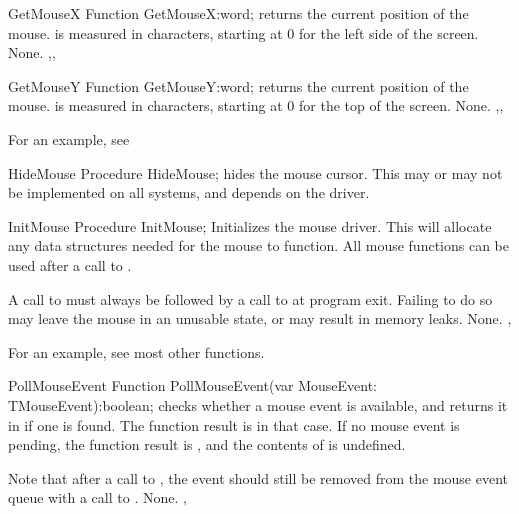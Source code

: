 \begin{function}{GetMouseX}
\Declaration
Function GetMouseX:word;
\Description
{} returns the current  position of the mouse.  is
measured in characters, starting at 0 for the left side of the screen.
\Errors
None.
\SeeAlso
{},, 
\end{function}


\begin{function}{GetMouseY}
\Declaration
Function GetMouseY:word; 
\Description
{} returns the current  position of the mouse.  is
measured in characters, starting at 0 for the top of the screen.
\Errors
None.
\SeeAlso
{},, 
\end{function}

For an example, see 

\begin{procedure}{HideMouse}
\Declaration
Procedure HideMouse;
\Description
{} hides the mouse cursor. This may or may not be implemented
on all systems, and depends on the driver.
\Errors
\SeeAlso
\end{procedure}


\begin{procedure}{InitMouse}
\Declaration
Procedure InitMouse;
\Description
{} Initializes the mouse driver. This will allocate any data
structures needed for the mouse to function. All mouse functions can be
used after a call to .

A call to  must always be followed by a call to 
at program exit. Failing to do so may leave the mouse in an unusable state,
or may result in memory leaks.
\Errors
None.
\SeeAlso
{}, 
\end{procedure}

For an example, see most other functions.

\begin{function}{PollMouseEvent}
\Declaration
Function PollMouseEvent(var MouseEvent: TMouseEvent):boolean; 
\Description
{} checks whether a mouse event is available, and 
returns it in  if one is found. The function result is
 in that case. If no mouse event is pending, the function result
is , and the contents of  is undefined.

Note that after a call to , the event should still 
be removed from the mouse event queue with a call to .
\Errors
None.
\SeeAlso
{}, 
\end{function}

